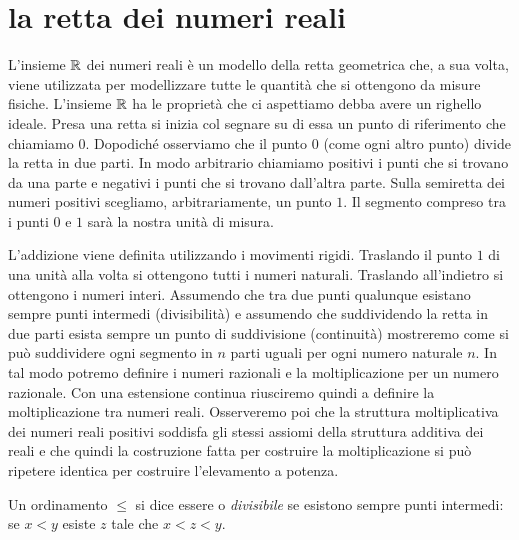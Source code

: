 
\section{la retta dei numeri reali}
\label{sec:reali}

L'insieme ${\mathbb R}$ dei numeri reali è un modello della retta geometrica che,
a sua volta, viene utilizzata per modellizzare tutte le quantità che si ottengono
da misure fisiche.
L'insieme ${\mathbb R}$ ha le proprietà che ci aspettiamo debba avere un righello ideale.
Presa una retta si inizia col segnare
su di essa un punto di riferimento che chiamiamo $0$. Dopodiché osserviamo che
il punto $0$ (come ogni altro punto) divide la retta in due parti. In modo arbitrario
chiamiamo positivi i punti che si trovano da una parte e negativi i punti che
si trovano dall'altra parte. Sulla semiretta dei numeri positivi scegliamo, arbitrariamente,
un punto $1$. Il segmento compreso tra i punti $0$ e $1$ sarà la nostra unità di
misura.

L'addizione viene definita utilizzando i movimenti rigidi.
Traslando il punto $1$ di una unità alla volta si ottengono tutti i numeri naturali.
Traslando all'indietro si ottengono i numeri interi. 
Assumendo che tra due punti qualunque esistano sempre punti intermedi (divisibilità) e
assumendo che suddividendo la retta in due parti esista sempre un punto di 
suddivisione (continuità) mostreremo come si può suddividere 
ogni segmento in $n$ parti uguali per ogni numero naturale $n$. 
In tal modo potremo definire i numeri razionali e la moltiplicazione per un numero razionale.
Con una estensione continua riusciremo quindi a definire la moltiplicazione 
tra numeri reali. 
Osserveremo poi che la struttura moltiplicativa dei numeri reali positivi soddisfa 
gli stessi assiomi della struttura additiva dei reali e che quindi la costruzione fatta 
per costruire la moltiplicazione si può ripetere identica per costruire l'elevamento a potenza.


\begin{definition}
  Un ordinamento $\le$ si dice essere
   o \emph{divisibile} 
  se esistono sempre punti intermedi:
  se $x<y$ esiste $z$ tale che $x < z < y$.
\end{definition}
  
